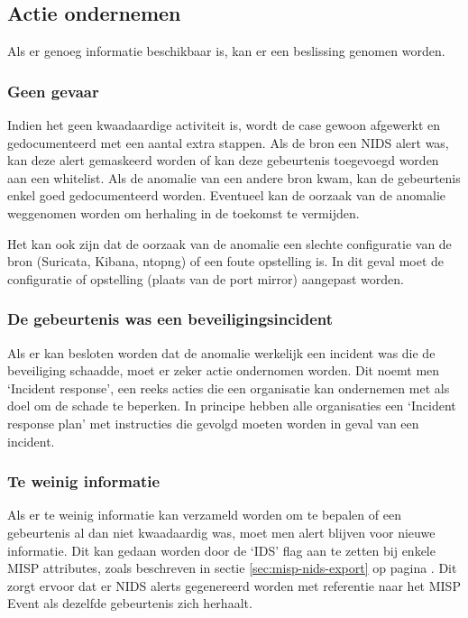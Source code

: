 \documentclass[a4paper,12pt]{report}
\begin{document}
\subsection{Actie ondernemen}
Als er genoeg informatie beschikbaar is, kan er een beslissing genomen worden.

\subsubsection{Geen gevaar}
Indien het geen kwaadaardige activiteit is, wordt de case gewoon afgewerkt en gedocumenteerd met een aantal extra stappen.
Als de bron een NIDS alert was, kan deze alert gemaskeerd worden of kan deze gebeurtenis toegevoegd worden aan een whitelist.
Als de anomalie van een andere bron kwam, kan de gebeurtenis enkel goed gedocumenteerd worden.
Eventueel kan de oorzaak van de anomalie weggenomen worden om herhaling in de toekomst te vermijden.

Het kan ook zijn dat de oorzaak van de anomalie een slechte configuratie van de bron (Suricata, Kibana, ntopng) of een foute opstelling is.
In dit geval moet de configuratie of opstelling (plaats van de port mirror) aangepast worden.

\subsubsection{De gebeurtenis was een beveiligingsincident}
Als er kan besloten worden dat de anomalie werkelijk een incident was die de beveiliging schaadde, moet er zeker actie ondernomen worden.
Dit noemt men `Incident response', een reeks acties die een organisatie kan ondernemen met als doel om de schade te beperken.
In principe hebben alle organisaties een `Incident response plan' met instructies die gevolgd moeten worden in geval van een incident.
\autocite{digitalguardian:incident-response}

\subsubsection{Te weinig informatie}
Als er te weinig informatie kan verzameld worden om te bepalen of een gebeurtenis al dan niet kwaadaardig was, moet men alert blijven voor nieuwe informatie.
Dit kan gedaan worden door de `IDS' flag aan te zetten bij enkele MISP attributes, zoals beschreven in sectie \ref{sec:misp-nids-export} op pagina \pageref{sec:misp-nids-export}.
Dit zorgt ervoor dat er NIDS alerts gegenereerd worden met referentie naar het MISP Event als dezelfde gebeurtenis zich herhaalt.
\end{document}
